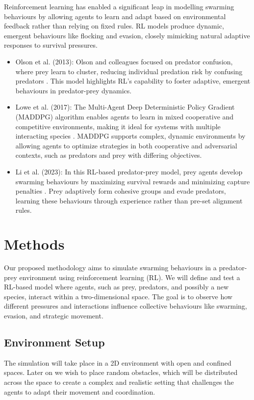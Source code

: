 \documentclass[9pt]{pnas-new}
\begin{document}
Reinforcement learning has enabled a significant leap in modelling swarming behaviours by allowing agents to learn and adapt based on environmental feedback rather than relying on fixed rules. RL models produce dynamic, emergent behaviours like flocking and evasion, closely mimicking natural adaptive responses to survival pressures.

\begin{itemize}
    \item Olson et al. (2013): Olson and colleagues focused on predator confusion, where prey learn to cluster, reducing individual predation risk by confusing predators \cite{olson2013predator}. This model highlights RL's capability to foster adaptive, emergent behaviours in predator-prey dynamics.
    \item Lowe et al. (2017): The Multi-Agent Deep Deterministic Policy Gradient (MADDPG) algorithm enables agents to learn in mixed cooperative and competitive environments, making it ideal for systems with multiple interacting species \cite{lowe2017}. MADDPG supports complex, dynamic environments by allowing agents to optimize strategies in both cooperative and adversarial contexts, such as predators and prey with differing objectives.
    \item Li et al. (2023): In this RL-based predator-prey model, prey agents develop swarming behaviours by maximizing survival rewards and minimizing capture penalties \cite{li2023predator}. Prey adaptively form cohesive groups and evade predators, learning these behaviours through experience rather than pre-set alignment rules.
\end{itemize}


\section*{Methods}

Our proposed methodology aims to simulate swarming behaviours in a predator-prey environment using reinforcement learning (RL). We will define and test a RL-based model where agents, such as prey, predators, and possibly a new species, interact within a two-dimensional space. The goal is to observe how different pressures and interactions influence collective behaviours like swarming, evasion, and strategic movement.

\subsection{Environment Setup}
The simulation will take place in a 2D environment with open and confined spaces. 
Later on we wish to place random obstacles, which will be distributed across the space to create a complex and realistic setting that challenges the agents to adapt their movement and coordination. 
\end{document}
